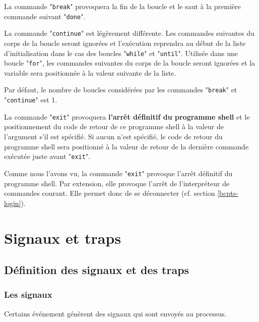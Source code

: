 La commande "\texttt{break}" provoquera la fin de la boucle et le saut {\`a} la premi{\`e}re
commande suivant "\texttt{done}".

La commande "\texttt{continue}" est l{\'e}g{\`e}rement diff{\'e}rente. Les
commandes suivantes du corps de la boucle seront ignor{\'e}es et l'ex{\'e}cution
reprendra au d{\'e}but de la liste d'initialisation dans le cas des boucles
"\texttt{while}" et "\texttt{until}". Utilis{\'e}e dans une boucle "\texttt{for}",
les commandes suivantes du corps de la boucle seront ignor{\'e}es et la
variable sera positionn{\'e}e {\`a} la valeur suivante de la liste.

Par d{\'e}faut, le nombre de boucles consid{\'e}r{\'e}es par les commandes "\texttt{break}"
et "\texttt{continue}" est 1.

La commande "\texttt{exit}" provoquera \textbf{l'arr{\^e}t d{\'e}finitif du
programme shell} et le positionnement du code de retour de ce programme
shell {\`a} la valeur de l'argument s'il est sp{\'e}cifi{\'e}. Si aucun n'est
sp{\'e}cifi{\'e}, le code de retour du programme shell sera positionn{\'e} {\`a} la
valeur de retour de la derni{\`e}re commande ex{\'e}cut{\'e}e juste avant "\texttt{exit}".

\begin{remarque}
Comme nous l'avons vu, la commande "\texttt{exit}" provoque l'arr{\^e}t d{\'e}finitif du
programme shell. Par extension, elle provoque l'arr{\^e}t de l'interpr{\'e}teur de commandes
courant. Elle permet donc de se d{\'e}connecter (cf. section \ref{bcpts-login}).
\end{remarque}

\section{Signaux et traps}

\subsection{D{\'e}finition des signaux et des traps}

\subsubsection{Les signaux}

Certains {\'e}v{\'e}nement g{\'e}n{\`e}rent des signaux
qui sont envoy{\'e}s au processus.

